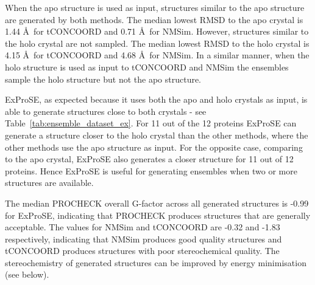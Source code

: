 When the apo structure is used as input, structures similar to the apo structure are generated by both methods.
The median lowest RMSD to the apo crystal is 1.44 \AA\ for tCONCOORD and 0.71 \AA\ for NMSim.
However, structures similar to the holo crystal are not sampled.
The median lowest RMSD to the holo crystal is 4.15 \AA\ for tCONCOORD and 4.68 \AA\ for NMSim.
In a similar manner, when the holo structure is used as input to tCONCOORD and NMSim the ensembles sample the holo structure but not the apo structure.

ExProSE, as expected because it uses both the apo and holo crystals as input, is able to generate structures close to both crystals - see Table~\ref{tab:ensemble_dataset_ex}.
For 11 out of the 12 proteins ExProSE can generate a structure closer to the holo crystal than the other methods, where the other methods use the apo structure as input.
For the opposite case, comparing to the apo crystal, ExProSE also generates a closer structure for 11 out of 12 proteins.
Hence ExProSE is useful for generating ensembles when two or more structures are available.

The median PROCHECK overall G-factor across all generated structures is -0.99 for ExProSE, indicating that PROCHECK produces structures that are generally acceptable.
The values for NMSim and tCONCOORD are -0.32 and -1.83 respectively, indicating that NMSim produces good quality structures and tCONCOORD produces structures with poor stereochemical quality.
The stereochemistry of generated structures can be improved by energy minimisation (see below).


